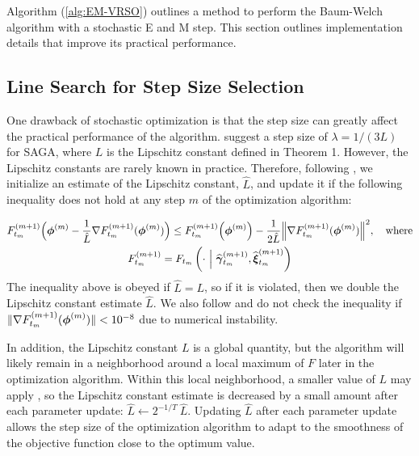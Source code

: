 
Algorithm (\ref{alg:EM-VRSO}) outlines a method to perform the Baum-Welch algorithm with a stochastic E and M step. This section outlines implementation details that improve its practical performance.

\subsection{Line Search for Step Size Selection}
\label{subsec:est_L}

One drawback of stochastic optimization is that the step size can greatly affect the practical performance of the algorithm. %
\citet{Defazio:2014} suggest a step size of $\lambda = 1/(3L)$ for SAGA, where $L$ is the Lipschitz constant defined in Theorem 1. However, the Lipschitz constants are rarely known in practice. Therefore, following \citet{Schmidt:2017}, we initialize an estimate of the Lipschitz constant, $\hat L$, and update it if the following inequality does not hold at any step $m$ of the optimization algorithm:

\begin{gather}
    F^{(m+1)}_{t_m}\Big(\boldsymbol{\phi}^{(m)} - \frac{1}{\hat L} \nabla F_{t_m}^{(m+1)}(\boldsymbol{\phi}^{(m)}) \Big) \leq F^{(m+1)}_{t_m}\Big(\boldsymbol{\phi}^{(m)}\Big) - \frac{1}{2 \hat L} \Big\| \nabla F_{t_m}^{(m+1)}(\boldsymbol{\phi}^{(m)}) \Big\| ^2, \quad \text{where} \label{ineq:F} \\
    F_{t_m}^{(m+1)} = F_{t_m}\left(\cdot ~ \Big | ~ \widehat {\boldsymbol{\gamma}}^{(m+1)}_{t_m}, \widehat {\boldsymbol{\xi}}^{(m+1)}_{t_m}\right)
    \label{ineq:F}
\end{gather}
%
The inequality above is obeyed if $\hat L = L$, so if it is violated, then we double the Lipschitz constant estimate $\hat L$. We also follow \citet{Schmidt:2017} and do not check the inequality if $\| \nabla F_{t_m}^{(m+1)}(\boldsymbol{\phi}^{(m)})\| < 10^{-8}$ due to numerical instability. 

In addition, the Lipschitz constant $L$ is a global quantity, but the algorithm will likely remain in a neighborhood around a local maximum of $F$ later in the optimization algorithm. Within this local neighborhood, a smaller value of $L$ may apply \citep{Schmidt:2017}, so the Lipschitz constant estimate is decreased by a small amount after each parameter update:
%
$\hat L \leftarrow 2^{-1/T} ~ \hat L$.
%
Updating $\hat L$ after each parameter update allows the step size of the optimization algorithm to adapt to the smoothness of the objective function close to the optimum value.


